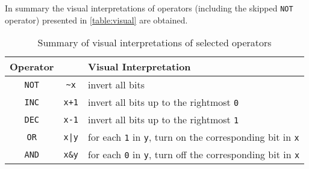 In summary the visual interpretations of operators
(including the skipped \lstinline$NOT$ operator)
presented in \autoref{table:visual} are obtained.

\begin{table}[H]
\centering
\begin{tabular}{cc|l}
Operator & & Visual Interpretation\\
\hline
\lstinline$NOT$ & \lstinline$~x$
    & invert all bits\\
\lstinline$INC$ & \lstinline$x+1$
    & invert all bits up to the rightmost \lstinline$0$\\
\lstinline$DEC$ & \lstinline$x-1$
    & invert all bits up to the rightmost \lstinline$1$\\
\lstinline$OR$  & \lstinline$x|y$
    & for each \lstinline$1$ in \lstinline$y$,
        turn on the corresponding bit in \lstinline$x$\\
\lstinline$AND$ & \lstinline$x&y$
    & for each \lstinline$0$ in \lstinline$y$,
        turn off the corresponding bit in \lstinline$x$\\
\end{tabular}
\caption{Summary of visual interpretations of selected operators}
\label{table:visual}
\end{table}
